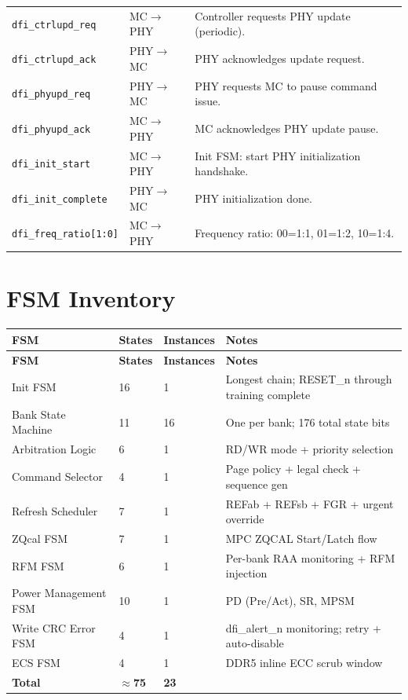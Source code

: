 \documentclass[11pt,a4paper]{article}
\newcommand{\sig}[1]{\textcolor{ddrteal}{\texttt{#1}}}
\begin{document}
\begin{longtable}{L{4.8cm} C{2.2cm} L{7.5cm}}
\sig{dfi\_ctrlupd\_req}      & MC$\to$PHY & Controller requests PHY update (periodic). \\
\sig{dfi\_ctrlupd\_ack}      & PHY$\to$MC & PHY acknowledges update request. \\
\sig{dfi\_phyupd\_req}       & PHY$\to$MC & PHY requests MC to pause command issue. \\
\sig{dfi\_phyupd\_ack}       & MC$\to$PHY & MC acknowledges PHY update pause. \\
\sig{dfi\_init\_start}       & MC$\to$PHY & Init FSM: start PHY initialization handshake. \\
\sig{dfi\_init\_complete}    & PHY$\to$MC & PHY initialization done. \\
\sig{dfi\_freq\_ratio[1:0]}  & MC$\to$PHY & Frequency ratio: 00=1:1, 01=1:2, 10=1:4. \\
\end{longtable}

\section{FSM Inventory}

\begin{longtable}{L{4.2cm} C{2cm} C{2.2cm} L{6.1cm}}
\toprule
\textbf{FSM} & \textbf{States} & \textbf{Instances} & \textbf{Notes} \\
\midrule
\endfirsthead\toprule\textbf{FSM}&\textbf{States}&\textbf{Instances}&\textbf{Notes}\\\midrule\endhead
\bottomrule\endfoot

Init FSM              & 16 & 1  & Longest chain; RESET\_n through training complete \\
Bank State Machine    & 11 & 16 & One per bank; 176 total state bits \\
Arbitration Logic     & 6  & 1  & RD/WR mode + priority selection \\
Command Selector      & 4  & 1  & Page policy + legal check + sequence gen \\
Refresh Scheduler     & 7  & 1  & REFab + REFsb + FGR + urgent override \\
ZQcal FSM             & 7  & 1  & MPC ZQCAL Start/Latch flow \\
RFM FSM               & 6  & 1  & Per-bank RAA monitoring + RFM injection \\
Power Management FSM  & 10 & 1  & PD (Pre/Act), SR, MPSM \\
Write CRC Error FSM   & 4  & 1  & dfi\_alert\_n monitoring; retry + auto-disable \\
ECS FSM               & 4  & 1  & DDR5 inline ECC scrub window \\
\midrule
{}
\textbf{Total}        & \textbf{$\approx$75} & \textbf{23} & \\
\end{longtable}
\end{document}
